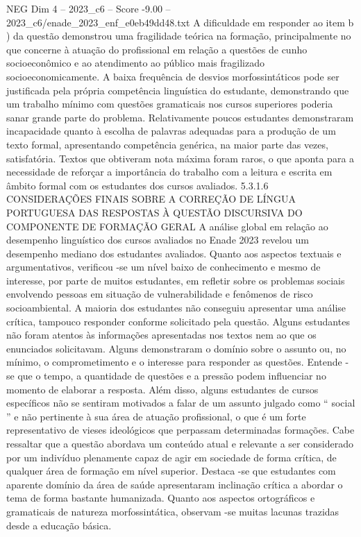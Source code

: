 \begin{textsample}{NEG Dim 4 – 2023\_c6 – Score -9.00 – 2023\_c6/enade\_2023\_enf\_e0eb49dd48.txt}
A dificuldade em responder ao item b ) da questão demonstrou uma fragilidade teórica na formação, principalmente no que concerne à atuação do profissional em relação a questões de cunho socioeconômico e ao atendimento ao público mais fragilizado socioeconomicamente.
A baixa frequência de desvios morfossintáticos pode ser justificada pela própria competência linguística do estudante, demonstrando que um trabalho mínimo com questões gramaticais nos cursos superiores poderia sanar grande parte do problema.
Relativamente poucos estudantes demonstraram incapacidade quanto à escolha de palavras adequadas para a produção de um texto formal, apresentando competência genérica, na maior parte das vezes, satisfatória.
Textos que obtiveram nota máxima foram raros, o que aponta para a necessidade de reforçar a importância do trabalho com a leitura e escrita em âmbito formal com os estudantes dos cursos avaliados. 5.3.1.6 CONSIDERAÇÕES FINAIS SOBRE A CORREÇÃO DE LÍNGUA PORTUGUESA DAS RESPOSTAS À QUESTÃO DISCURSIVA DO COMPONENTE DE FORMAÇÃO GERAL A análise global em relação ao desempenho linguístico dos cursos avaliados no Enade 2023 revelou um desempenho mediano dos estudantes avaliados.
Quanto aos aspectos textuais e argumentativos, verificou -se um nível baixo de conhecimento e mesmo de interesse, por parte de muitos estudantes, em refletir sobre os problemas sociais envolvendo pessoas em situação de vulnerabilidade e fenômenos de risco socioambiental.
A maioria dos estudantes não conseguiu apresentar uma análise crítica, tampouco responder conforme solicitado pela questão.
Alguns estudantes não foram atentos às informações apresentadas nos textos nem ao que os enunciados solicitavam.
Alguns demonstraram o domínio sobre o assunto ou, no mínimo, o comprometimento e o interesse para responder as questões.
Entende -se que o tempo, a quantidade de questões e a pressão podem influenciar no momento de elaborar a resposta.
Além disso, alguns estudantes de cursos específicos não se sentiram motivados a falar de um assunto julgado como “ social ” e não pertinente à sua área de atuação profissional, o que é um forte representativo de vieses ideológicos que perpassam determinadas formações.
Cabe ressaltar que a questão abordava um conteúdo atual e relevante a ser considerado por um indivíduo plenamente capaz de agir em sociedade de forma crítica, de qualquer área de formação em nível superior.
Destaca -se que estudantes com aparente domínio da área de saúde apresentaram inclinação crítica a abordar o tema de forma bastante humanizada.
Quanto aos aspectos ortográficos e gramaticais de natureza morfossintática, observam -se muitas lacunas trazidas desde a educação básica.

\end{textsample}
